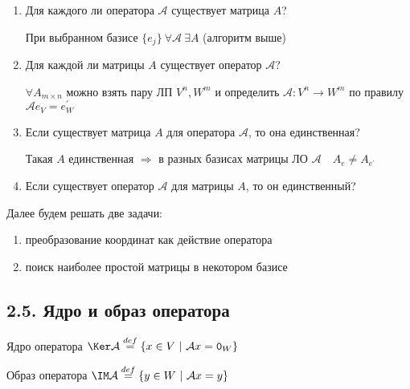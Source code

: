 \documentclass[12pt]{article}
\begin{document}
    \begin{enumerate}
        \item Для каждого ли оператора $\mathcal{A}$ существует матрица $A$?

        При выбранном базисе $\{e_j\} \ \forall \mathcal{A} \ \exists A$ (алгоритм выше)

        \item Для каждой ли матрицы $A$ существует оператор $\mathcal{A}$?

        $\forall A_{m\times n}$ можно взять пару ЛП $V^n, W^m$ и определить $\mathcal{A} : V^n \rightarrow W^m$ по правилу $\mathcal{A}e_V = e^\prime_W$

        \item Если существует матрица $A$ для оператора $\mathcal{A}$, то она единственная?

        Такая $A$ единственная $\Longrightarrow$ в разных базисах матрицы ЛО $\mathcal{A} \quad A_e \neq A_{e^\prime}$

        \item Если существует оператор $\mathcal{A}$ для матрицы $A$, то он единственный?

        \Lab
    \end{enumerate}

    \Nota Далее будем решать две задачи:

    \begin{enumerate}
        \item преобразование координат как действие оператора

        \item поиск наиболее простой матрицы в некотором базисе
    \end{enumerate}

    \subsection[p2\_5]{2.5. Ядро и образ оператора}

    \hypertarget{kernalandimageofoperator}{}

    \Defs Ядро оператора $\Ker \mathcal{A} \stackrel{def}{=} \{x \in V \ | \ \mathcal{A}x = \texttt{0}_W\}$

    \Defs Образ оператора $\IM \mathcal{A} \stackrel{def}{=} \{y \in W \ | \ \mathcal{A}x = y\}$
\end{document}
